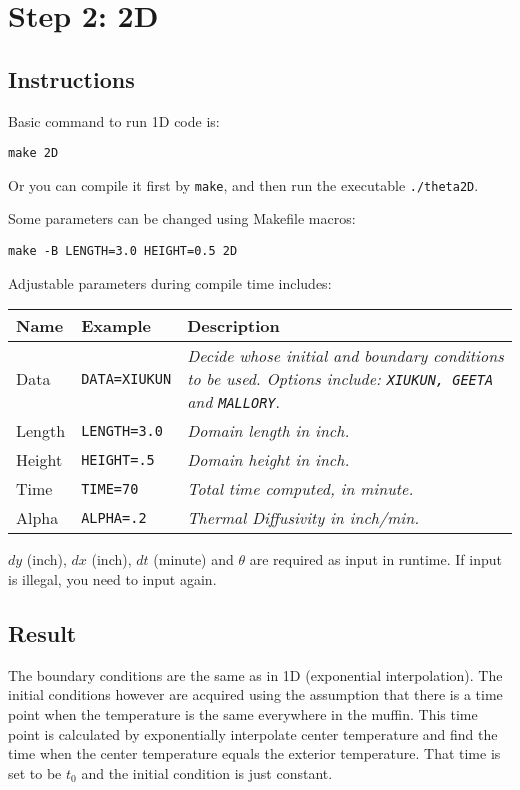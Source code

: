 \documentclass[letterpaper,12pt,fleqn]{article}
\newcommand{\mybox}[1]{\par\noindent\colorbox{shadecolor}
{\parbox{\dimexpr\textwidth-2\fboxsep\relax}{\tt #1}}}
\newcommand{\code}[1]{\colorbox{shadecolor}{\tt #1}}
\begin{document}
\section{Step 2: 2D}
\subsection{Instructions}
Basic command to run 1D code is:
\mybox{make 2D}

Or you can compile it first by \code{make}, and then run the executable \code{./theta2D}\;.

Some parameters can be changed using Makefile macros:
\mybox{make -B LENGTH=3.0 HEIGHT=0.5 2D}

Adjustable parameters during compile time includes:
\begin{table}[h]
  \begin{tabular}{p{2cm} p{3.3cm} p{7cm}}
    \toprule
    \textbf{Name} & \textbf{Example} & \textbf{Description}\\
    \midrule
    Data    &	\code{DATA=XIUKUN}    &	  \textit{Decide whose initial and boundary conditions to be used.
      Options include:
  \texttt{XIUKUN, GEETA} and \texttt{MALLORY}}.\\
    Length  &	\code{LENGTH=3.0}     &	  \textit{Domain length in inch.}\\
    Height  &	\code{HEIGHT=.5}      &	  \textit{Domain height in inch.}\\
    Time    &	\code{TIME=70}	      &	  \textit{Total time computed, in minute.}\\
    Alpha   &	\code{ALPHA=.2}	      &	  \textit{Thermal Diffusivity in inch/min.}\\
    \bottomrule
  \end{tabular}
\end{table}

$dy$ (inch), $dx$ (inch), $dt$ (minute) and $\theta$ are required as input in runtime.
If input is illegal, you need to input again.

\subsection{Result}
The boundary conditions are the same as in 1D (exponential interpolation).
The initial conditions however are acquired using the assumption that
there is a time point when the temperature is the same everywhere in the muffin.
This time point is calculated by exponentially interpolate center temperature
and find the time when the center temperature equals the exterior temperature.
That time is set to be $t_0$ and the initial condition is just constant.
\end{document}
